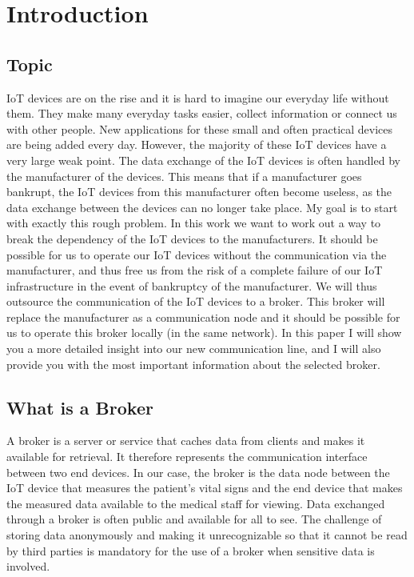 \chapter{Introduction}
\section{Topic}
IoT devices are on the rise and it is hard to imagine our everyday life without them. They make many everyday tasks easier, collect information or connect us with other people. New applications for these small and often practical devices are being added every day.
\newline
However, the majority of these IoT devices have a very large weak point. The data exchange of the IoT devices is often handled by the manufacturer of the devices. This means that if a manufacturer goes bankrupt, the IoT devices from this manufacturer often become useless, as the data exchange between the devices can no longer take place.
\newline
My goal is to start with exactly this rough problem. 
In this work we want to work out a way to break the dependency of the IoT devices to the manufacturers. It should be possible for us to operate our IoT devices without the communication via the manufacturer, and thus free us from the risk of a complete failure of our IoT infrastructure in the event of bankruptcy of the manufacturer. We will thus outsource the communication of the IoT devices to a broker. This broker will replace the manufacturer as a communication node and it should be possible for us to operate this broker locally (in the same network).
\newline
In this paper I will show you a more detailed insight into our new communication line, and I will also provide you with the most important information about the selected broker. 
\newpage
\section{What is a Broker}
A broker is a server or service that caches data from clients and makes it available for retrieval. It therefore represents the communication interface between two end devices. In our case, the broker is the data node between the IoT device that measures the patient's vital signs and the end device that makes the measured data available to the medical staff for viewing.
Data exchanged through a broker is often public and available for all to see. The challenge of storing data anonymously and making it unrecognizable so that it cannot be read by third parties is mandatory for the use of a broker when sensitive data is involved.

